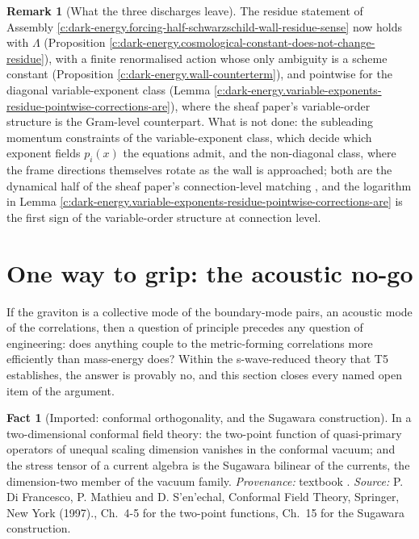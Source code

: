 \documentclass[11pt]{article}
\theoremstyle{definition}
\newtheorem{fact}[theorem]{Fact}
\newtheorem{remark}[theorem]{Remark}
\theoremstyle{plain}
\begin{document}
\begin{remark}[What the three discharges leave]\label{c:note.dark-energy.what-three-discharges-leave}
The residue statement of Assembly \ref{c:dark-energy.forcing-half-schwarzschild-wall-residue-sense} now holds with $\Lambda$ (Proposition \ref{c:dark-energy.cosmological-constant-does-not-change-residue}), with a finite renormalised action whose only ambiguity is a scheme constant (Proposition \ref{c:dark-energy.wall-counterterm}), and pointwise for the diagonal variable-exponent class (Lemma \ref{c:dark-energy.variable-exponents-residue-pointwise-corrections-are}), where the sheaf paper's variable-order structure \cite[\S 9]{ButlerT4} is the Gram-level counterpart. What is not done: the subleading momentum constraints of the variable-exponent class, which decide which exponent fields $p_i(x)$ the equations admit, and the non-diagonal class, where the frame directions themselves rotate as the wall is approached; both are the dynamical half of the sheaf paper's connection-level matching \cite[Rem.~8.28]{ButlerT4}, and the logarithm in Lemma \ref{c:dark-energy.variable-exponents-residue-pointwise-corrections-are} is the first sign of the variable-order structure at connection level.
\end{remark}

\section{One way to grip: the acoustic no-go}

\label{c:note.dark-energy.setting-one-way-grip-acoustic-no}
If the graviton is a collective mode of the boundary-mode pairs, an acoustic mode of the correlations, then a question of principle precedes any question of engineering: does anything couple to the metric-forming correlations more efficiently than mass-energy does? Within the s-wave-reduced theory that T5 establishes, the answer is provably no, and this section closes every named open item of the argument.

\begin{fact}[Imported: conformal orthogonality, and the Sugawara construction]\label{c:dark-energy.imported-conformal-orthogonality-sugawara-construction}
In a two-dimensional conformal field theory: the two-point function of quasi-primary operators of unequal scaling dimension vanishes in the conformal vacuum; and the stress tensor of a current algebra is the Sugawara bilinear of the currents, the dimension-two member of the vacuum family. \emph{Provenance:} textbook \cite[Ch.~4-5 for the two-point functions, Ch.~15 for the Sugawara construction]{DiFrancesco1997}.
\emph{Source:} P. Di Francesco, P. Mathieu and D. S'en'echal, Conformal Field Theory, Springer, New York (1997)., Ch.~4-5 for the two-point functions, Ch.~15 for the Sugawara construction.
\end{fact}
\end{document}
